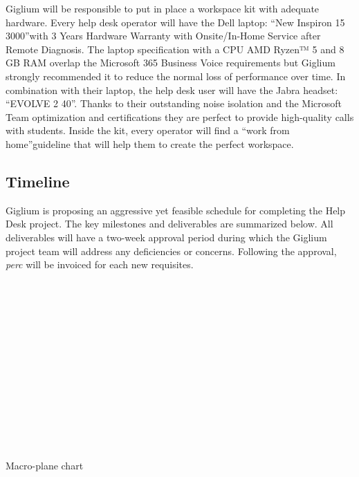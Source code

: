Giglium will be responsible to put in place a workspace kit with adequate hardware. 
Every help desk operator will have the Dell laptop: \textquotedblleft New Inspiron 15 3000\cite{dellpc}\textquotedblright with 3 Years Hardware Warranty with Onsite/In-Home Service after Remote Diagnosis. The laptop specification with a CPU AMD Ryzen™ 5\cite{amdcpu} and 8 GB RAM overlap the Microsoft 365 Business Voice requirements but Giglium strongly recommended it to reduce the normal loss of performance over time.  
In combination with their laptop, the help desk user will have the Jabra headset: \textquotedblleft EVOLVE 2 40\cite{jabraheadsets}\textquotedblright. Thanks to their outstanding noise isolation and the Microsoft Team optimization and certifications they are perfect to provide high-quality calls with students. 
Inside the kit, every operator will find a \textquotedblleft work from home\textquotedblright guideline that will help them to create the perfect workspace.


\subsection{Timeline}
Giglium is proposing an aggressive yet feasible schedule for completing the Help Desk project.
The key milestones and deliverables are summarized below. All
deliverables will have a two-week approval period during which the Giglium project
team will address any deficiencies or concerns. Following the approval, \textit{\gls{perc}} will be invoiced for each new requisites.
\bigskip


\begin{table}[H]
	\begin{ganttchart}[vgrid={draw=none, dotted}]{1}{18}
		 \\
		 \\
		 \\
		 \\
		 \\
		
		 \\
		 \\
		 \\
		 \\
		
		 \\
		 \\
	\end{ganttchart}
	\caption{Macro-plane chart}\label{tab:gantt}
\end{table}

